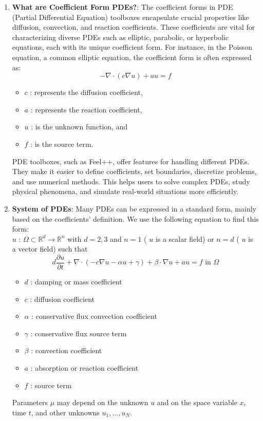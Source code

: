 \documentclass[12pt]{article}
\begin{document}
\begin{enumerate}
    \item \textbf{What are Coefficient Form PDEs?}: The coefficient forms in PDE (Partial Differential Equation) toolboxes encapsulate crucial properties like diffusion, convection, and reaction coefficients. These coefficients are vital for characterizing diverse PDEs such as elliptic, parabolic, or hyperbolic equations, each with its unique coefficient form.
    For instance, in the Poisson equation, a common elliptic equation, the coefficient form is often expressed as:
    \[
        -\nabla \cdot (c \nabla u) + au = f
    \]

    \begin{itemize}
        \item \(c\) : represents the diffusion coefficient,
        \item \(a\) : represents the reaction coefficient,
        \item \(u\) : is the unknown function, and
        \item \(f\) : is the source term.
    \end{itemize}
    
    PDE toolboxes, such as Feel++, offer features for handling different PDEs. They make it easier to define coefficients, set boundaries, discretize problems, and use numerical methods. This helps users to solve complex PDEs, study physical phenomena, and simulate real-world situations more efficiently.

    \item \textbf{System of PDEs}: Many PDEs can be expressed in a standard form, mainly based on the coefficients' definition. We use the following equation to find this form: \\
    \( u \) : \( \Omega \subset \mathbb{R}^d \longrightarrow \mathbb{R}^n \) with \( d = 2, 3 \) and \( n = 1 \) ( \( u \) is a scalar field) or \( n = d \) ( \( u \) is a vector field) such that
    \[
    d \frac{\partial u}{\partial t} + \nabla \cdot \left( -c \nabla u - \alpha u + \gamma \right) + \beta \cdot \nabla u + au = f \text{ in } \Omega
    \]
    \begin{itemize}
        \item \( d \) : damping or mass coefficient
        \item \( c \) : diffusion coefficient
        \item \( \alpha \) : conservative flux convection coefficient
        \item \( \gamma \) : conservative flux source term
        \item \( \beta \) : convection coefficient
        \item \( a \) : absorption or reaction coefficient
        \item \( f \) : source term
    \end{itemize}
    Parameters \( \mu \) may depend on the unknown \( u \) and on the space variable \( x \), time \( t \), and other unknowns \( u_1, \ldots, u_N \).


\end{enumerate}
\end{document}
